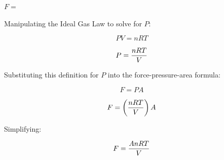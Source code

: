 \vskip 20pt

$F =$

\vskip 20pt







 






Manipulating the Ideal Gas Law to solve for $P$:

$$PV = nRT$$

$$P = {nRT \over V}$$

\vskip 10pt

Substituting this definition for $P$ into the force-pressure-area formula:

$$F = PA$$

$$F = \left( {nRT \over V} \right) A$$

\vskip 10pt

Simplifying:

$$F = {AnRT \over V}$$




